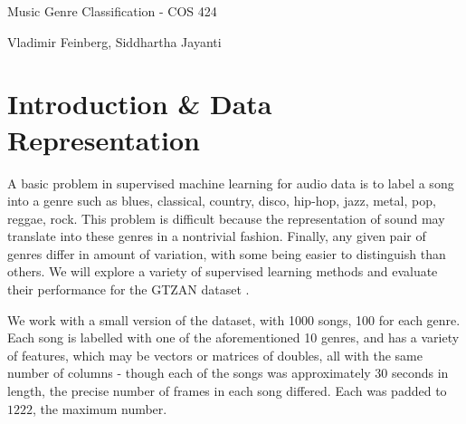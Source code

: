 \documentclass[9pt]{article}
\begin{document}
\begin{center}
{\large Music Genre Classification - COS 424}

{ Vladimir Feinberg, Siddhartha Jayanti}
\end{center}

\begin{abstract}
We explore a variety of supervised learning approaches for genre classification on an excerpt of the GTZAN dataset \cite{TC}. Methods explored are {\em Softmax, SVM, mSVM, Nearest Neighbors, Random Forest, Adaboosted Decision Stumps, Voting}, and a novel {\em Binary-Search mSVM} algorithm.
The top-performing method was an mSVM trained on the most informative 36\% of the \texttt{mfcc} and \texttt{chroma} features as determined by a Random Forest, a strategy used by \cite{vox}. This achieved 75.1\% with the features in Fisher vector representation, the hyperparameters of which where selected with a partial grid search.
\end{abstract}

\vspace{-0.2in}

 \section{Introduction \& Data Representation}
\vspace{-0.1in}

A basic problem in supervised machine learning for audio data is to label a song into a genre such as blues, classical, country, disco, hip-hop, jazz, metal, pop, reggae, rock.
This problem is difficult because the representation of sound may translate into these genres in a nontrivial fashion.
Finally, any given pair of genres differ in amount of variation, with some being easier to distinguish than others.
We will explore a variety of supervised learning methods and evaluate their performance for the GTZAN dataset \cite{TC}.


We work with a small version of the dataset, with 1000 songs, 100 for each genre. Each song is labelled with one of the aforementioned 10 genres, and has a variety of features, which may be vectors or matrices of doubles, all with the same number of columns - though each of the songs was approximately 30 seconds in length, the precise number of frames in each song differed. Each was padded to $1222$, the maximum number.
\end{document}
